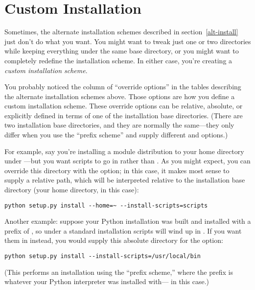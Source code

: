 \documentclass{howto}
\begin{document}
\section{Custom Installation}
\label{custom-install}

Sometimes, the alternate installation schemes described in
section~\ref{alt-install} just don't do what you want.  You might
want to tweak just one or two directories while keeping everything under
the same base directory, or you might want to completely redefine the
installation scheme.  In either case, you're creating a \emph{custom
installation scheme}.

You probably noticed the column of ``override options'' in the tables
describing the alternate installation schemes above.  Those options are
how you define a custom installation scheme.  These override options can
be relative, absolute, or explicitly defined in terms of one of the
installation base directories.  (There are two installation base
directories, and they are normally the same---they only differ when you
use the \UNIX{} ``prefix scheme'' and supply different
 and  options.)

For example, say you're installing a module distribution to your home
directory under \UNIX---but you want scripts to go in
 rather than .
As you might expect, you can override this directory with the
 option; in this case, it makes most
sense to supply a relative path, which will be interpreted relative to
the installation base directory (your home directory, in this case):

\begin{verbatim}
python setup.py install --home=~ --install-scripts=scripts
\end{verbatim}

Another \UNIX{} example: suppose your Python installation was built and
installed with a prefix of , so under a standard 
installation scripts will wind up in .  If
you want them in  instead, you would supply this
absolute directory for the  option:

\begin{verbatim}
python setup.py install --install-scripts=/usr/local/bin
\end{verbatim}

(This performs an installation using the ``prefix scheme,'' where the
prefix is whatever your Python interpreter was installed with---
 in this case.)
\end{document}
